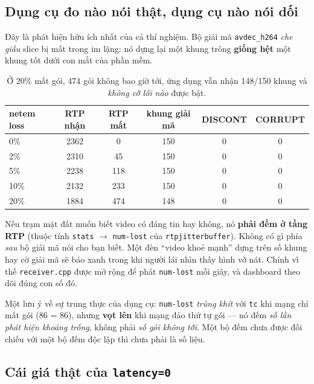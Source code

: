 \documentclass[12pt]{ai_conquer2026}
\begin{document}
\subsection{Dụng cụ đo nào nói thật, dụng cụ nào nói dối}

Đây là phát hiện hữu ích nhất của cả thí nghiệm. Bộ giải mã \texttt{avdec\_h264}
\emph{che giấu} slice bị mất trong im lặng: nó dựng lại một khung trông
\textbf{giống hệt} một khung tốt dưới con mắt của phần mềm.

\begin{table}[h]
\centering
\begin{tabular}{@{}lccccc@{}}
\toprule
netem loss & RTP nhận & RTP mất & khung giải mã & DISCONT & CORRUPT \\
\midrule
0\%  & 2362 & 0   & 150 & 0 & 0 \\
2\%  & 2310 & 45  & 150 & 0 & 0 \\
5\%  & 2238 & 118 & 150 & 0 & 0 \\
10\% & 2132 & 233 & 150 & 0 & 0 \\
20\% & 1884 & 474 & 148 & 0 & 0 \\
\bottomrule
\end{tabular}
\caption{Ở 20\% mất gói, 474 gói không bao giờ tới, ứng dụng vẫn nhận 148/150
khung và \emph{không cờ lỗi nào} được bật.}
\end{table}

\begin{aivncodebox}
Nếu trạm mặt đất muốn biết video có đáng tin hay không, nó \textbf{phải đếm ở
tầng RTP} (thuộc tính \texttt{stats} $\to$ \texttt{num-lost} của
\texttt{rtpjitterbuffer}). Không có gì phía \emph{sau} bộ giải mã nói cho bạn
biết. Một đèn ``video khoẻ mạnh'' dựng trên số khung hay cờ giải mã sẽ báo xanh
trong khi người lái nhìn thấy hình vỡ nát. Chính vì thế \texttt{receiver.cpp}
được mở rộng để phát \texttt{num-lost} mỗi giây, và dashboard theo dõi đúng con
số đó.
\end{aivncodebox}

Một lưu ý về sự trung thực của dụng cụ: \texttt{num-lost} \emph{trùng khít} với
\texttt{tc} khi mạng chỉ mất gói (86 = 86), nhưng \textbf{vọt lên} khi mạng đảo
thứ tự gói --- nó đếm \emph{số lần phát hiện khoảng trống}, không phải \emph{số
gói không tới}. Một bộ đếm chưa được đối chiếu với một bộ đếm độc lập thì chưa
phải là số liệu.

\subsection{Cái giá thật của \texttt{latency=0}}
\end{document}
